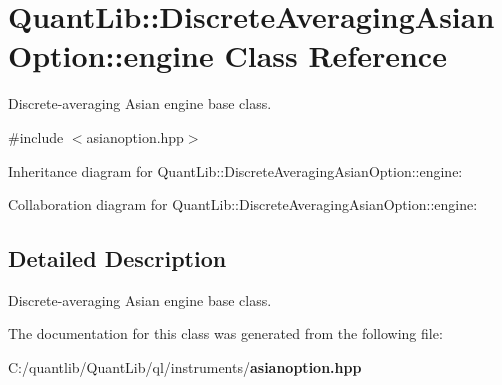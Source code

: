 \section{Quant\+Lib\+:\+:Discrete\+Averaging\+Asian\+Option\+:\+:engine Class Reference}
\label{class_quant_lib_1_1_discrete_averaging_asian_option_1_1engine}


Discrete-\/averaging Asian engine base class.  




{\ttfamily \#include $<$asianoption.\+hpp$>$}



Inheritance diagram for Quant\+Lib\+:\+:Discrete\+Averaging\+Asian\+Option\+:\+:engine\+:


Collaboration diagram for Quant\+Lib\+:\+:Discrete\+Averaging\+Asian\+Option\+:\+:engine\+:


\subsection{Detailed Description}
Discrete-\/averaging Asian engine base class. 

The documentation for this class was generated from the following file\+:\begin{DoxyCompactItemize}
\item 
C\+:/quantlib/\+Quant\+Lib/ql/instruments/{\bf asianoption.\+hpp}\end{DoxyCompactItemize}

